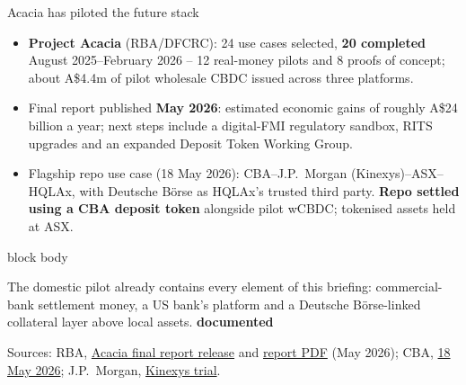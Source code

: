 \documentclass[aspectratio=169,12pt]{beamer}
\newcommand{\rust}[1]{\textcolor{Rust}{\textbf{#1}}}
\newcommand{\source}[1]{\vfill\par\fontsize{5.4}{6.5}\selectfont\color{Quiet}Sources: #1}
\newcommand{\tightitems}{\setlength{\itemsep}{0.42em}\setlength{\parskip}{0pt}}
\newcommand{\tdoc}{\textcolor{Sage}{\bfseries documented}}
\newenvironment{statement}{%
  \begin{beamercolorbox}[sep=.18cm,rounded=false,wd=\linewidth]{block body}%
  \fontsize{13}{15.5}\selectfont\bfseries
}{\end{beamercolorbox}}
\begin{document}
\begin{frame}[shrink=25]{Acacia has piloted the future stack}
  \begin{itemize}\tightitems
    \item \rust{Project Acacia} (RBA/DFCRC): 24 use cases selected, \rust{20 completed} August 2025--February 2026 -- 12 real-money pilots and 8 proofs of concept; about A\$4.4m of pilot wholesale CBDC issued across three platforms.
    \item Final report published \rust{May 2026}: estimated economic gains of roughly A\$24 billion a year; next steps include a digital-FMI regulatory sandbox, RITS upgrades and an expanded Deposit Token Working Group.
    \item Flagship repo use case (18 May 2026): CBA--J.P.\ Morgan (Kinexys)--ASX--HQLAx, with Deutsche B\"orse as HQLAx's trusted third party. \rust{Repo settled using a CBA deposit token} alongside pilot wCBDC; tokenised assets held at ASX.
  \end{itemize}
  \begin{statement}
    The domestic pilot already contains every element of this briefing: commercial-bank settlement money, a US bank's platform and a Deutsche B\"orse-linked collateral layer above local assets. \hfill\tdoc
  \end{statement}
  \source{RBA, \href{https://www.rba.gov.au/media-releases/2026/mr-26-13.html}{Acacia final report release} and \href{https://www.rba.gov.au/payments-and-infrastructure/central-bank-digital-currency/pdf/project-acacia-final-report.pdf}{report PDF} (May 2026); CBA, \href{https://www.commbank.com.au/articles/newsroom/2026/05/rba-wholesale-funding-markets-trial.html}{18 May 2026}; J.P.\ Morgan, \href{https://www.jpmorgan.com/payments/newsroom/kinexys-project-acacia-tokenization-trial-australia}{Kinexys trial}.}
\end{frame}
\end{document}
